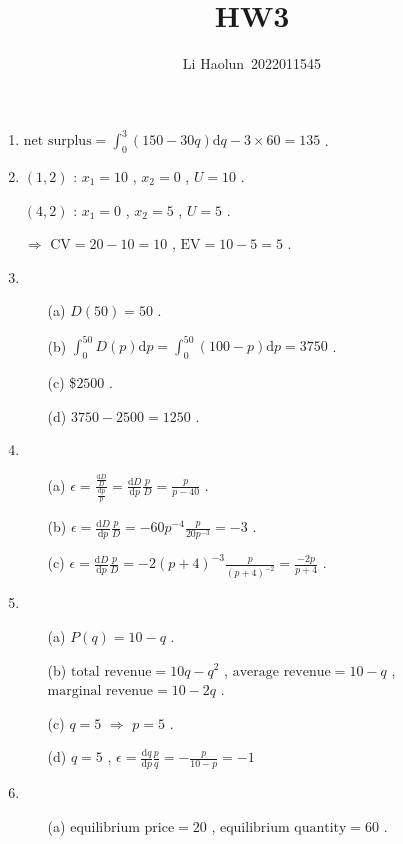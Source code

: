 \documentclass{article}
\title{HW3}
\author{Li Haolun\ 2022011545}
\begin{document}
\maketitle
\begin{enumerate}
    \item $\text{net surplus}=\int_{0}^{3}(150-30q)\mathrm{d}q-3\times60=135$ .
    \item $(1,2)$ : $x_1=10$ , $x_2=0$ , $U=10$ . \par
    $(4,2)$ : $x_1=0$ , $x_2=5$ , $U=5$ . \par
    $\Rightarrow$ $\text{CV}=20-10=10$ , $\text{EV}=10-5=5$ .
    \item \begin{enumerate}
        \item[(a)] $D(50)=50$ .
        \item[(b)] $\int_{0}^{50}D(p)\mathrm{d}p=\int_{0}^{50}(100-p)\mathrm{d}p=3750$ .
        \item[(c)] \$$2500$ .
        \item[(d)] $3750-2500=1250$ .
    \end{enumerate}
    \item \begin{enumerate}
        \item[(a)] $\epsilon=\frac{\frac{\mathrm{d}D}{D}}{\frac{\mathrm{d}p}{p}}=\frac{\mathrm{d}D}{\mathrm{d}p}\frac{p}{D}=\frac{p}{p-40}$ .
        \item[(b)] $\epsilon=\frac{\mathrm{d}D}{\mathrm{d}p}\frac{p}{D}=-60p^{-4}\frac{p}{20p^{-3}}=-3$ .
        \item[(c)] $\epsilon=\frac{\mathrm{d}D}{\mathrm{d}p}\frac{p}{D}=-2(p+4)^{-3}\frac{p}{(p+4)^{-2}}=\frac{-2p}{p+4}$ .
    \end{enumerate}
    \item \begin{enumerate}
        \item[(a)] $P(q)=10-q$ .
        \item[(b)] $\text{total revenue}=10q-q^2$ , $\text{average revenue}=10-q$ , $\text{marginal revenue}=10-2q$ .
        \item[(c)] $q=5$ $\Rightarrow$ $p=5$ .
        \item[(d)] $q=5$ , $\epsilon=\frac{\mathrm{d}q}{\mathrm{d}p}\frac{p}{q}=-\frac{p}{10-p}=-1$
    \end{enumerate}
    \item \begin{enumerate}
        \item[(a)] $\text{equilibrium price}=20$ , $\text{equilibrium quantity}=60$ .

\end{enumerate}
\end{enumerate}
\end{document}
